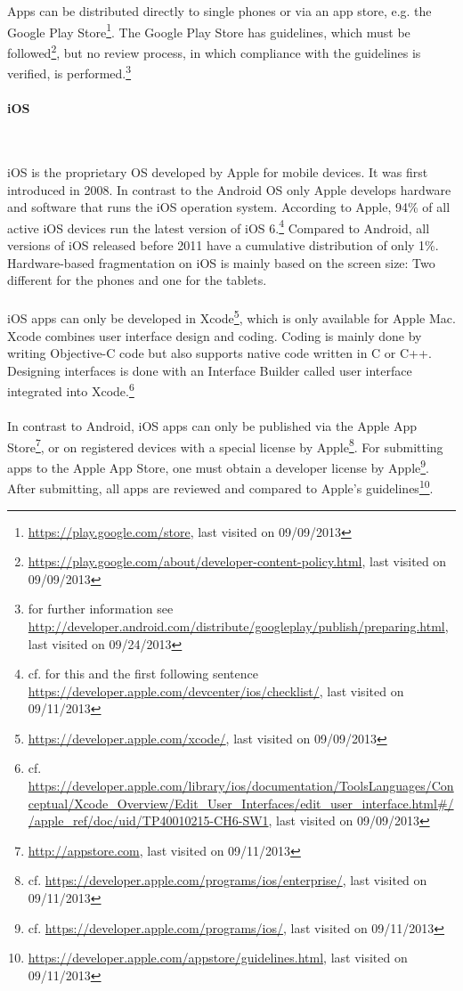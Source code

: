 \\
\\
Apps can be distributed directly to single phones or via an app store, e.g. the Google Play Store\footnote{\url{https://play.google.com/store}, last visited on 09/09/2013}. The Google Play Store has guidelines, which must be followed\footnote{\url{https://play.google.com/about/developer-content-policy.html}, last visited on 09/09/2013}, but no review process, in which compliance with the guidelines is verified, is performed.\footnote{for further information see \url{http://developer.android.com/distribute/googleplay/publish/preparing.html}, last visited on 09/24/2013}

\paragraph{iOS}$\;$

\vspace{0.75em}
iOS is the proprietary OS developed by Apple for mobile devices. It was first introduced in 2008. In contrast to the Android OS only Apple develops hardware and software that runs the iOS operation system. According to Apple, 94\% of all active iOS devices run the latest version of iOS 6.\footnote{cf. for this and the first following sentence \url{https://developer.apple.com/devcenter/ios/checklist/}, last visited on 09/11/2013} Compared to Android, all versions of iOS released before 2011 have a cumulative distribution of only 1\%. Hardware-based fragmentation on iOS is mainly based on the screen size: Two different for the phones and one for the tablets.
\\
\\
iOS apps can only be developed in Xcode\footnote{\url{https://developer.apple.com/xcode/}, last visited on 09/09/2013}, which is only available for Apple Mac. Xcode combines user interface design and coding. Coding is mainly done by writing Objective-C code but also supports native code written in C or C++. Designing interfaces is done with an Interface Builder called user interface integrated into Xcode.\footnote{cf. \url{https://developer.apple.com/library/ios/documentation/ToolsLanguages/Conceptual/Xcode_Overview/Edit_User_Interfaces/edit_user_interface.html\#//apple_ref/doc/uid/TP40010215-CH6-SW1}, last visited on 09/09/2013}
\\
\\
In contrast to Android, iOS apps can only be published via the Apple App Store\footnote{\url{http://appstore.com}, last visited on 09/11/2013}, or on registered devices with a special license by Apple\footnote{cf. \url{https://developer.apple.com/programs/ios/enterprise/}, last visited on 09/11/2013}. For submitting apps to the Apple App Store, one must obtain a developer license by Apple\footnote{cf. \url{https://developer.apple.com/programs/ios/}, last visited on 09/11/2013}. After submitting, all apps are reviewed and compared to Apple's guidelines\footnote{\url{https://developer.apple.com/appstore/guidelines.html}, last visited on 09/11/2013}.


